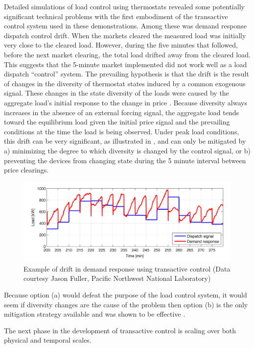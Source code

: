 Detailed simulations of load control using thermostats revealed some potentially significant technical problems with the first embodiment of the transactive control system used in these demonstrations. Among these was demand response dispatch control drift. When the markets cleared the measured load was initially very close to the cleared load.  However, during the five minutes that followed, before the next market clearing, the total load drifted away from the cleared load. This suggests that the 5-minute market implemented did not work well as a load dispatch ``control'' system.  The prevailing hypothesis is that the drift is the result of changes in the diversity of thermostat states induced by a common exogenous signal. These changes in the state diversity of the loads were caused by the aggregate load's initial response to the change in price \cite{pnnl2014}.  Because diversity always increases in the absence of an external forcing signal, the aggregate load tends toward the equilibrium load given the initial price signal and the prevailing conditions at the time the load is being observed. Under peak load conditions, this drift can be very significant, as illustrated in , and can only be mitigated by a) minimizing the degree to which diversity is changed by the control signal, or b) preventing the devices from changing state during the 5 minute interval between price clearings. 
\begin{figure}[ht]
\centering
\includegraphics[width=6in]{load_control_drift.png}
\caption{Example of drift in demand response using transactive control (Data courtesy Jason Fuller, Pacific Northwest National Laboratory)}
\label{fig:load_control_drift}
\end{figure}
Because option (a) would defeat the purpose of the load control system, it would seem if diversity changes are the cause of the problem then option (b) is the only mitigation strategy available and was shown to be effective \cite{chassin2014b}.

The next phase in the development of transactive control is scaling over both physical and temporal scales. 

